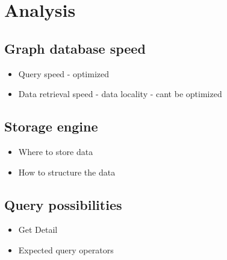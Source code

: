 \chapter{Analysis}


\section{Graph database speed}

\begin{itemize}
	\item Query speed - optimized
	\item Data retrieval speed - data locality - cant be optimized
\end{itemize}


\section{Storage engine}

\begin{itemize}
	\item Where to store data
	\item How to structure the data
\end{itemize}


\section{Query possibilities}

\begin{itemize}
	\item Get Detail
	\item Expected query operators
\end{itemize}



